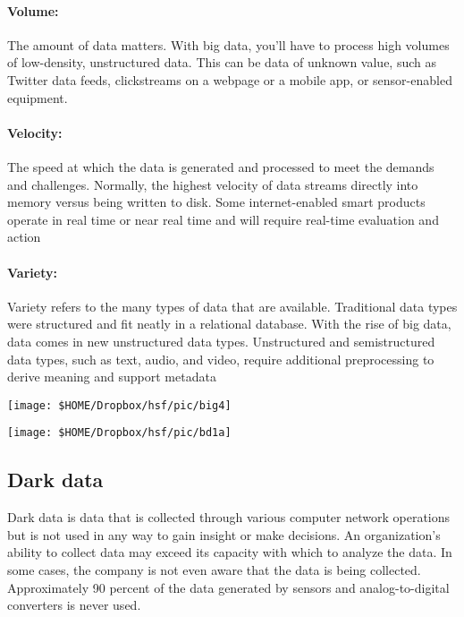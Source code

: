 


\pbn
\paragraph{Volume:} The amount of data matters. With big data, you’ll have to process high volumes of low-density, unstructured data. This can be data of unknown value, such as Twitter data feeds, clickstreams on a webpage or a mobile app, or sensor-enabled equipment.
\paragraph{Velocity:} The speed at which the data is generated and processed to meet the demands and challenges.  Normally, the highest velocity of data streams directly into memory versus being written to disk. Some internet-enabled smart products operate in real time or near real time and will require real-time evaluation and action
\paragraph{Variety:} Variety refers to the many types of data that are available. Traditional data types were structured and fit neatly in a relational
database. With the rise of big data, data comes in new unstructured data types. Unstructured and semistructured data types, such as
text, audio, and video, require additional preprocessing to derive meaning and support metadata


\texttt{[image: \$HOME/Dropbox/hsf/pic/big4]}

\texttt{[image: \$HOME/Dropbox/hsf/pic/bd1a]}


\pbn
\subsection{Dark data}
Dark data is data that is collected through various computer network operations but is not used in any way to gain insight or make decisions. An organization's ability to collect data may exceed its capacity with which to analyze the data. In some cases, the company is not even aware that the data is being collected. Approximately 90 percent of the data generated by sensors and analog-to-digital converters is never used.




